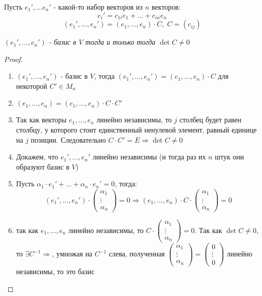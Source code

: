 \begin{proposal}
    
    Пусть $e_1', \dots e_n'$ - какой-то набор векторов из $n$ векторов:
    $$e_i' = c_{1i} e_1 + \dots + c_{ni} e_n$$
    $$(e_1', \dots, e_n') = (e_1, \dots, e_n) \cdot C, \; C = \left(c_{ij}\right)$$

    \textit{$(e_1', \dots, e_n')$ - базис в $V$ тогда и только тогда $\det C \not= 0$}

    \begin{proof}~
        
        \begin{enumerate}
            \item $(e_1', \dots, e_n')$ - базис в $V$, тогда $(e_1', \dots, e_n') = (e_1, \dots, e_n) \cdot C$ для некоторой $C' \in M_n$
            \item $(e_1, \dots, e_n) = (e_1, \dots, e_n) \cdot C \cdot C'$
            \item Так как векторы $e_1, \dots, e_n$ линейно независимы, то $j$ столбец будет равен столбцу, у которого стоит единственный ненулевой элемент, равный единице на $j$ позиции. Следовательно $C \cdot C' = E \Rightarrow \det C \not= 0$
            \item Докажем, что $e_1', \dots, e_n'$ линейно независимы (и тогда раз их $n$ штук они образуют базис в $V$)
            \item Пусть $\alpha_1 \cdot e_1' + \dots + \alpha_n \cdot e_n' = 0$, тогда:
            $$(e_1', \dots, e_n') \cdot \begin{pmatrix}
                \alpha_1 \\ \vdots \\ \alpha_n
            \end{pmatrix} = 0 \Rightarrow (e_1, \dots, e_n) \cdot C \cdot \begin{pmatrix}
                \alpha_1 \\ \vdots \\ \alpha_n
            \end{pmatrix} = 0$$
            \item так как $e_1, \dots, e_n$ линейно независимы, то $C \cdot \begin{pmatrix}
                \alpha_1 \\ \vdots \\ \alpha_n
            \end{pmatrix} = 0$. Так как $\det C \not= 0$, то $\exists C^{-1} \Rightarrow $, умножая на $C^{-1}$ слева, полученная $\begin{pmatrix}
                \alpha_1 \\ \vdots \\ \alpha_n
            \end{pmatrix} = \begin{pmatrix}
                0 \\ \vdots \\ 0
            \end{pmatrix}$ линейно независимы, то это базис
        \end{enumerate}

    \end{proof}

\end{proposal}


